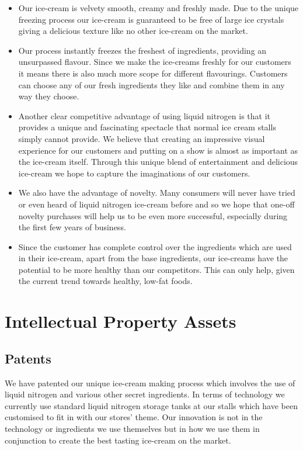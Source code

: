 \documentclass{article}
\begin{document}
  \begin{itemize}
  \item Our ice-cream is velvety smooth, creamy and freshly made. Due to the unique freezing process our ice-cream is guaranteed to be free of large ice crystals giving a delicious texture like no other ice-cream on the market.

  \item Our process instantly freezes the freshest of ingredients, providing an unsurpassed flavour. Since we make the ice-creams freshly for our customers it means there is also much more scope for different flavourings. Customers can choose any of our fresh ingredients they like and combine them in any way they choose.

  \item Another clear competitive advantage of using liquid nitrogen is that it provides a unique and fascinating spectacle that normal ice cream stalls simply cannot provide. We believe that creating an impressive visual experience for our customers and putting on a show is almost as important as the ice-cream itself. Through this unique blend of entertainment and delicious ice-cream we hope to capture the imaginations of our customers.

  \item We also have the advantage of novelty. Many consumers will never have tried or even heard of liquid nitrogen ice-cream before and so we hope that one-off novelty purchases will help us to be even more successful, especially during the first few years of business.

  \item Since the customer has complete control over the ingredients which are used in their ice-cream, apart from the base ingredients, our ice-creams have the potential to be more healthy than our competitors. This can only help, given the current trend towards healthy, low-fat foods.
  \end{itemize}

\section{Intellectual Property Assets}

  \subsection{Patents}

  We have patented our unique ice-cream making process which involves the use of liquid nitrogen and various other secret ingredients. In terms of technology we currently use standard liquid nitrogen storage tanks at our stalls which have been customised to fit in with our stores' theme. Our innovation is not in the technology or ingredients we use themselves but in how we use them in conjunction to create the best tasting ice-cream on the market.
\end{document}
